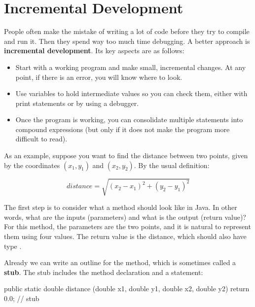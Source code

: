 \section{Incremental Development}
\label{distance}


People often make the mistake of writing a lot of code before they try to compile and run it.
Then they spend way too much time debugging.
A better approach is {\bf incremental development}.
Its key aspects are as follows:

\begin{itemize}

\item Start with a working program and make small, incremental changes.
At any point, if there is an error, you will know where to look.

\item Use variables to hold intermediate values so you can check them, either with print statements or by using a debugger.

\item Once the program is working, you can consolidate multiple statements into compound expressions (but only if it does not make the program more difficult to read).

\end{itemize}

As an example, suppose you want to find the distance between two points, given by the coordinates $(x_1, y_1)$ and $(x_2, y_2)$.
By the usual definition:

\vspace{-1ex}
\[ distance = \sqrt{(x_2 - x_1)^2 +(y_2 - y_1)^2} \]

The first step is to consider what a  method should look like in Java.
In other words, what are the inputs (parameters) and what is the output (return value)?
For this method, the parameters are the two points, and it is natural to represent them using four  values.
The return value is the distance, which should also have type .


Already we can write an outline for the method, which is sometimes called a {\bf stub}.
The stub includes the method declaration and a  statement:

\begin{code}
public static double distance
        (double x1, double y1, double x2, double y2) {
    return 0.0;  // stub
}
\end{code}

